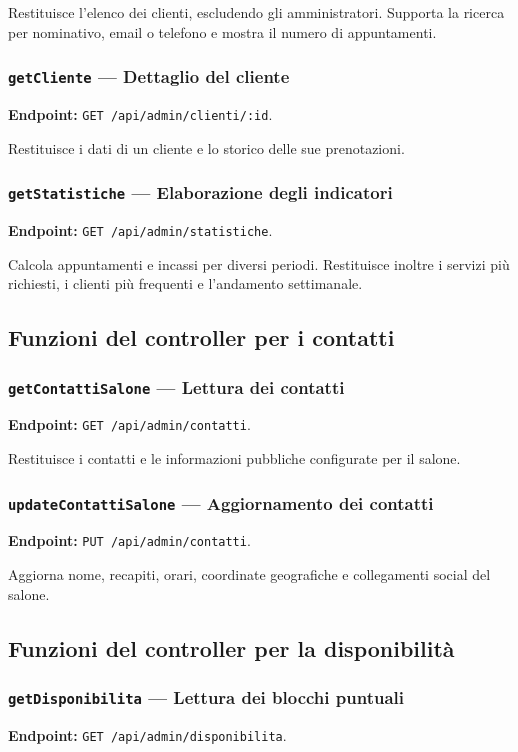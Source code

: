 \documentclass[12pt,a4paper]{article}
\begin{document}
Restituisce l'elenco dei clienti, escludendo gli amministratori. Supporta la
ricerca per nominativo, email o telefono e mostra il numero di appuntamenti.

\subsubsection{\texttt{getCliente} --- Dettaglio del cliente}
\textbf{Endpoint:} \texttt{GET /api/admin/clienti/:id}.

Restituisce i dati di un cliente e lo storico delle sue prenotazioni.

\subsubsection{\texttt{getStatistiche} --- Elaborazione degli indicatori}
\textbf{Endpoint:} \texttt{GET /api/admin/statistiche}.

Calcola appuntamenti e incassi per diversi periodi. Restituisce inoltre i
servizi più richiesti, i clienti più frequenti e l'andamento settimanale.

\subsection{Funzioni del controller per i contatti}

\subsubsection{\texttt{getContattiSalone} --- Lettura dei contatti}
\textbf{Endpoint:} \texttt{GET /api/admin/contatti}.

Restituisce i contatti e le informazioni pubbliche configurate per il salone.

\subsubsection{\texttt{updateContattiSalone} --- Aggiornamento dei contatti}
\textbf{Endpoint:} \texttt{PUT /api/admin/contatti}.

Aggiorna nome, recapiti, orari, coordinate geografiche e collegamenti social
del salone.

\subsection{Funzioni del controller per la disponibilità}

\subsubsection{\texttt{getDisponibilita} --- Lettura dei blocchi puntuali}
\textbf{Endpoint:} \texttt{GET /api/admin/disponibilita}.
\end{document}
